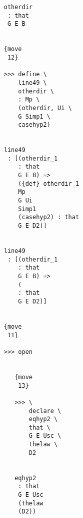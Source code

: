 \documentclass[12pt]{article}
\begin{document}
\begin{verbatim}
                                    otherdir 
                                     : that 
                                     G E B


                                    {move 
                                     12}

                                    >>> define \
                                        line49 \
                                        otherdir \
                                        : Mp \
                                        (otherdir, Ui \
                                        G Simp1 \
                                        casehyp2)


                                    line49 
                                     : [(otherdir_1 
                                        : that 
                                        G E B) => 
                                        ({def} otherdir_1 
                                        Mp 
                                        G Ui 
                                        Simp1 
                                        (casehyp2) : that 
                                        G E D2)]


                                    line49 
                                     : [(otherdir_1 
                                        : that 
                                        G E B) => 
                                        (--- 
                                        : that 
                                        G E D2)]


                                    {move 
                                     11}

                                    >>> open


                                       {move 
                                        13}

                                       >>> \
                                           declare \
                                           eqhyp2 \
                                           that \
                                           G E Usc \
                                           thelaw \
                                           D2


                                       eqhyp2 
                                        : that 
                                        G E Usc 
                                        (thelaw 
                                        (D2))



\end{verbatim}
\end{document}
